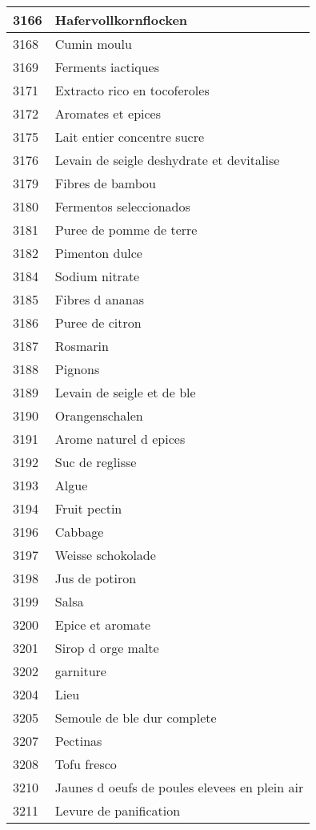 \begin{longtable}{|l|l|}
3166 & Hafervollkornflocken \\ \hline 
3168 & Cumin moulu \\ \hline 
3169 & Ferments iactiques \\ \hline 
3171 & Extracto rico en tocoferoles \\ \hline 
3172 & Aromates et epices \\ \hline 
3175 & Lait entier concentre sucre \\ \hline 
3176 & Levain de seigle deshydrate et devitalise \\ \hline 
3179 & Fibres de bambou \\ \hline 
3180 & Fermentos seleccionados \\ \hline 
3181 & Puree de pomme de terre \\ \hline 
3182 & Pimenton dulce \\ \hline 
3184 & Sodium nitrate \\ \hline 
3185 & Fibres d ananas \\ \hline 
3186 & Puree de citron \\ \hline 
3187 & Rosmarin \\ \hline 
3188 & Pignons \\ \hline 
3189 & Levain de seigle et de ble \\ \hline 
3190 & Orangenschalen \\ \hline 
3191 & Arome naturel d epices \\ \hline 
3192 & Suc de reglisse \\ \hline 
3193 & Algue \\ \hline 
3194 & Fruit pectin \\ \hline 
3196 & Cabbage \\ \hline 
3197 & Weisse schokolade \\ \hline 
3198 & Jus de potiron \\ \hline 
3199 & Salsa \\ \hline 
3200 & Epice et aromate \\ \hline 
3201 & Sirop d orge malte \\ \hline 
3202 & garniture \\ \hline 
3204 & Lieu \\ \hline 
3205 & Semoule de ble dur complete \\ \hline 
3207 & Pectinas \\ \hline 
3208 & Tofu fresco \\ \hline 
3210 & Jaunes d oeufs de poules elevees en plein air \\ \hline 
3211 & Levure de panification \\ \hline 

\end{longtable}

